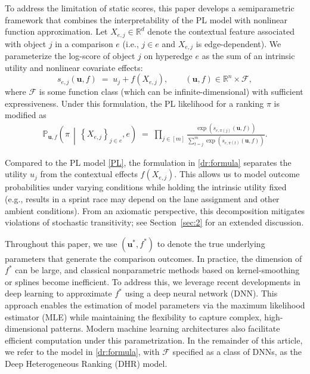 \documentclass[
  12pt]{article}
\begin{document}
To address the limitation of static scores, this paper develops a semiparametric framework that combines the interpretability of the PL model with nonlinear function approximation. Let $X_{e,j} \in \mathbb{R}^d$ denote the contextual feature associated with object $j$ in a comparison $e$ (i.e., $j\in e$ and $X_{e,j}$ is edge-dependent). We parameterize the log-score of object $j$ on hyperedge $e$ as the sum of an intrinsic utility and nonlinear covariate effects:
$$s_{e,j}(\boldsymbol{u}, f)\;=\;u_j + f\!\left(X_{e,j}\right),
\qquad
(\boldsymbol{u}, f)\in \mathbb{R}^n \times \mathcal{F},$$
where $\mathcal{F}$ is some function class (which can be infinite-dimensional) with sufficient expressiveness. Under this formulation, the PL likelihood for a ranking $\pi$ is modified as
\begin{align}\label{dr:formula}
\mathbb{P}_{\boldsymbol{u}, f}\!\left(\pi \,\middle|\, \left\{X_{e,j}\right\}_{j\in e}, e\right)
\;=\;
\prod_{j\in [m]}
\frac{\exp\left( s_{e,\pi(j)}\left(\boldsymbol{u}, f\right) \right)}
{\sum_{t=j}^m \exp\left( s_{e,\pi(t)}\left(\boldsymbol{u}, f\right) \right)}.
\end{align}

Compared to the PL model \eqref{PL}, the formulation in \eqref{dr:formula} separates the utility $u_j$ from the contextual effects $f(X_{e,j})$. This allows us to model outcome probabilities under varying conditions while holding the intrinsic utility fixed 
(e.g., {results in a sprint race may depend on the lane assignment and other ambient conditions}). 
From an axiomatic perspective, this decomposition mitigates violations of stochastic transitivity; see Section~\ref{sec:2} for an extended discussion. 

Throughout this paper, we use  $(\boldsymbol{u}^*, f^*)$ to denote the true underlying parameters that generate the comparison outcomes. In practice, the dimension of $f^*$ can be large, and classical nonparametric methods based on kernel-smoothing or splines become inefficient. To address this, we leverage recent developments in deep learning to approximate $f^*$ using a deep neural network (DNN). This approach enables the estimation of model parameters via the maximum likelihood estimator (MLE) while maintaining the flexibility to capture complex, high-dimensional patterns. Modern machine learning architectures also facilitate efficient computation under this parametrization. In the remainder of this article, we refer to the model in \eqref{dr:formula}, with $\mathcal{F}$ specified as a class of DNNs, as the Deep Heterogeneous Ranking (DHR) model.
\end{document}
